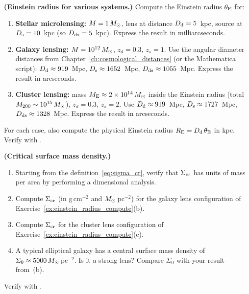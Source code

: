 \begin{exercise}
\label{ex:einstein_radius_compute}
\textbf{(Einstein radius for various systems.)}
Compute the Einstein radius $\theta_{\mathrm{E}}$ for:
\begin{enumerate}[label=(\alph*)]
    \item \textbf{Stellar microlensing:} $M = 1\,M_{\odot}$, lens at
          distance $D_{\mathrm{d}} = 5$~kpc, source at $D_{\mathrm{s}} = 10$~kpc (so
          $D_{\mathrm{ds}} = 5$~kpc).  Express the result in milliarcseconds.
    \item \textbf{Galaxy lensing:} $M = 10^{12}\,M_{\odot}$, $z_d = 0.3$,
          $z_s = 1$.  Use the angular diameter distances from
          Chapter~\ref{ch:cosmological_distances} (or the Mathematica script):
          $D_{\mathrm{d}} \approx 919$~Mpc, $D_{\mathrm{s}} \approx 1652$~Mpc,
          $D_{\mathrm{ds}} \approx 1055$~Mpc.  Express the result in arcseconds.
    \item \textbf{Cluster lensing:} mass $M_{\mathrm{E}} \approx
          2\times10^{14}\,M_{\odot}$ inside the Einstein radius (total
          $M_{200} \sim 10^{15}\,M_{\odot}$), $z_d = 0.3$, $z_s = 2$.  Use $D_{\mathrm{d}} \approx 919$~Mpc, $D_{\mathrm{s}} \approx 1727$~Mpc,
          $D_{\mathrm{ds}} \approx 1328$~Mpc.  Express the result in arcseconds.
\end{enumerate}
For each case, also compute the physical Einstein radius $R_{\mathrm{E}} = D_{\mathrm{d}}\,\theta_{\mathrm{E}}$
in kpc.  Verify with
.
\end{exercise}

\begin{exercise}
\label{ex:sigma_cr_compute}
\textbf{(Critical surface mass density.)}
\begin{enumerate}[label=(\alph*)]
    \item Starting from the definition~\eqref{eq:sigma_cr}, verify that
          $\Sigma_{\mathrm{cr}}$ has units of mass per area by performing a
          dimensional analysis.
    \item Compute $\Sigma_{\mathrm{cr}}$ (in g\,cm$^{-2}$ and $M_{\odot}$\,pc$^{-2}$)
          for the galaxy lens configuration of
          Exercise~\ref{ex:einstein_radius_compute}(b).
    \item Compute $\Sigma_{\mathrm{cr}}$ for the cluster lens configuration of
          Exercise~\ref{ex:einstein_radius_compute}(c).
    \item A typical elliptical galaxy has a central surface mass density
          of $\Sigma_0 \approx 5000\,M_{\odot}$\,pc$^{-2}$.  Is it a
          strong lens?  Compare $\Sigma_0$ with your result from~(b).
\end{enumerate}
Verify with
.
\end{exercise}

